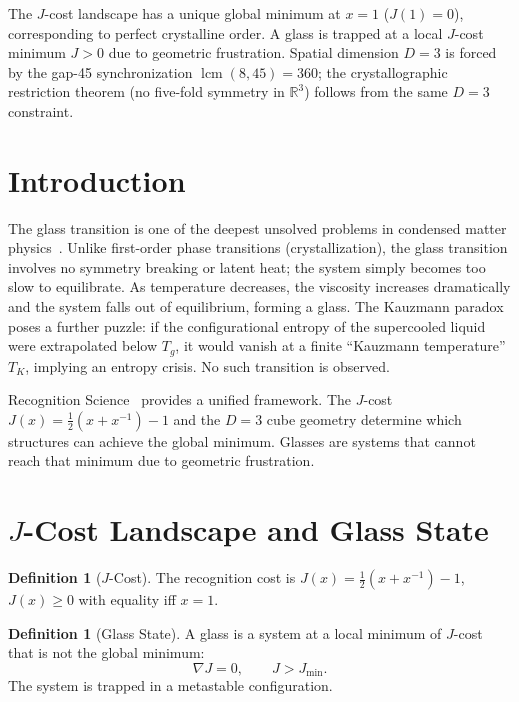 \documentclass[12pt,a4paper]{article}
\theoremstyle{definition}
\newtheorem{definition}[theorem]{Definition}
\theoremstyle{remark}
\begin{document}
\noindent The $J$-cost landscape has a unique global minimum at $x = 1$
($J(1) = 0$), corresponding to perfect crystalline order.  A glass is
trapped at a local $J$-cost minimum $J > 0$ due to geometric frustration.
Spatial dimension $D = 3$ is forced by the gap-45 synchronization
$\operatorname{lcm}(8,45) = 360$; the crystallographic restriction theorem
(no five-fold symmetry in $\mathbb{R}^3$) follows from the same $D = 3$
constraint.

\section{Introduction}
\label{sec:intro}

The glass transition is one of the deepest unsolved problems in
condensed matter physics~\cite{Anderson}.  Unlike first-order phase
transitions (crystallization), the glass transition involves no
symmetry breaking or latent heat; the system simply becomes too slow
to equilibrate.  As temperature decreases, the viscosity increases
dramatically and the system falls out of equilibrium, forming a glass.
The Kauzmann paradox~\cite{Kauzmann} poses a further puzzle: if the
configurational entropy of the supercooled liquid were extrapolated
below $T_g$, it would vanish at a finite ``Kauzmann temperature''
$T_K$, implying an entropy crisis.  No such transition is observed.

Recognition Science~\cite{RS_Axioms} provides a unified framework.
The $J$-cost $J(x) = \frac{1}{2}(x + x^{-1}) - 1$ and the $D = 3$
cube geometry determine which structures can achieve the global
minimum.  Glasses
are systems that cannot reach that minimum due to geometric
frustration.

\section{$J$-Cost Landscape and Glass State}
\label{sec:landscape}

\begin{definition}[$J$-Cost]
\label{def:jcost}
The recognition cost is $J(x) = \frac{1}{2}(x + x^{-1}) - 1$,
$J(x) \geq 0$ with equality iff $x = 1$.
\end{definition}

\begin{definition}[Glass State]
\label{def:glass}
A glass is a system at a local minimum of $J$-cost that is not the
global minimum:
\begin{equation}
  \nabla J = 0, \qquad J > J_{\min}.
\end{equation}
The system is trapped in a metastable configuration.
\end{definition}
\end{document}
